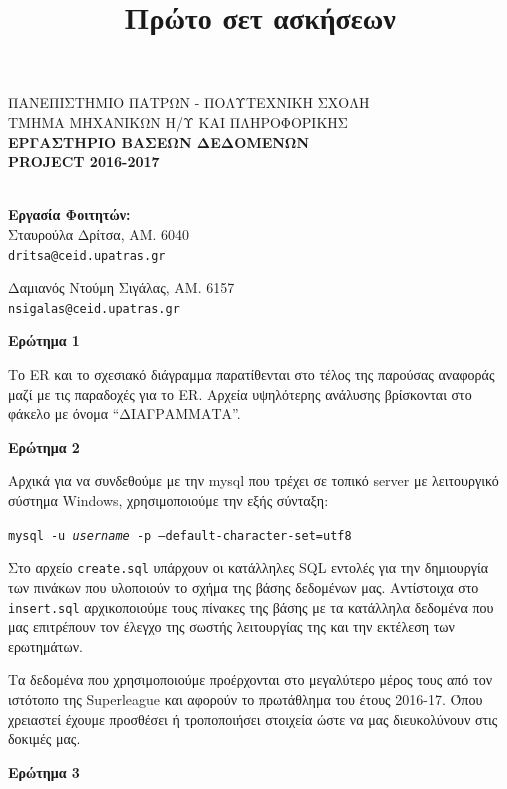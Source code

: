 \documentclass[a4paper,oneside,titlepage,11pt]{article}
\title{Πρώτο σετ ασκήσεων}
\date{}
\author{}
\begin{document}
\begin{center}
{\small ΠΑΝΕΠΙΣΤΗΜΙΟ ΠΑΤΡΩΝ - ΠΟΛΥΤΕΧΝΙΚΗ ΣΧΟΛΗ\\
ΤΜΗΜΑ ΜΗΧΑΝΙΚΩΝ Η/Υ ΚΑΙ ΠΛΗΡΟΦΟΡΙΚΗΣ} \\
\vspace{0.3cm}
\textbf{ΕΡΓΑΣΤΗΡΙΟ ΒΑΣΕΩΝ ΔΕΔΟΜΕΝΩΝ}
\\
\textbf{PROJECT 2016-2017}
\\ \leavevmode \\
\end{center}

\begin{flushright}
\textbf{Εργασία Φοιτητών:}\\
Σταυρούλα Δρίτσα, ΑΜ. 6040\\
\texttt{dritsa@ceid.upatras.gr}

Δαμιανός Ντούμη Σιγάλας, ΑΜ. 6157\\
\texttt{nsigalas@ceid.upatras.gr}
\end{flushright}



\noindent\textbf{Ερώτημα 1} 

Το ER και το σχεσιακό διάγραμμα παρατίθενται στο τέλος της παρούσας αναφοράς μαζί με τις παραδοχές για το ER. Αρχεία υψηλότερης ανάλυσης βρίσκονται στο φάκελο με όνομα ``ΔΙΑΓΡΑΜΜΑΤΑ''.
\vspace{0.6cm}

\noindent\textbf{Ερώτημα 2} 

Αρχικά για να συνδεθούμε με την mysql που τρέχει σε τοπικό server με λειτουργικό σύστημα Windows, χρησιμοποιούμε την εξής σύνταξη:
\begin{center}
\texttt{mysql -u \textit{username} -p --default-character-set=utf8}
\end{center}

Στο αρχείο \texttt{create.sql} υπάρχουν οι κατάλληλες SQL εντολές για την δημιουργία των πινάκων που υλοποιούν το σχήμα της βάσης δεδομένων μας. Αντίστοιχα στο \texttt{insert.sql} αρχικοποιούμε τους πίνακες της βάσης με τα κατάλληλα δεδομένα που μας επιτρέπουν τον έλεγχο της σωστής λειτουργίας της και την εκτέλεση των ερωτημάτων.

Τα δεδομένα που χρησιμοποιούμε προέρχονται στο μεγαλύτερο μέρος τους από τον ιστότοπο της Superleague και αφορούν το πρωτάθλημα του έτους 2016-17. Όπου χρειαστεί έχουμε προσθέσει ή τροποποιήσει στοιχεία ώστε να μας διευκολύνουν στις δοκιμές μας.
\vspace{0.6cm}

\noindent\textbf{Ερώτημα 3} 
\vspace{0.3cm}
\end{document}
